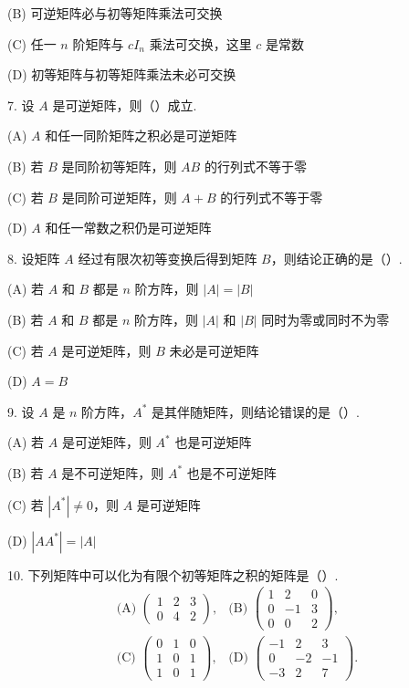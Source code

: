 \documentclass[UTF8, 12pt, fontset=fandol, oneside]{ctexart}
\begin{document}
(B) 可逆矩阵必与初等矩阵乘法可交换

(C) 任一 $n$ 阶矩阵与 $cI_n$ 乘法可交换，这里 $c$ 是常数

(D) 初等矩阵与初等矩阵乘法未必可交换

7. 设 $A$ 是可逆矩阵，则（\quad ）成立.

(A) $A$ 和任一同阶矩阵之积必是可逆矩阵

(B) 若 $B$ 是同阶初等矩阵，则 $AB$ 的行列式不等于零

(C) 若 $B$ 是同阶可逆矩阵，则 $A+B$ 的行列式不等于零

(D) $A$ 和任一常数之积仍是可逆矩阵

8. 设矩阵 $A$ 经过有限次初等变换后得到矩阵 $B$，则结论正确的是（\quad ）.

(A) 若 $A$ 和 $B$ 都是 $n$ 阶方阵，则 $|A|=|B|$

(B) 若 $A$ 和 $B$ 都是 $n$ 阶方阵，则 $|A|$ 和 $|B|$ 同时为零或同时不为零

(C) 若 $A$ 是可逆矩阵，则 $B$ 未必是可逆矩阵

(D) $A=B$

9. 设 $A$ 是 $n$ 阶方阵，$A^*$ 是其伴随矩阵，则结论错误的是（\quad ）.

(A) 若 $A$ 是可逆矩阵，则 $A^*$ 也是可逆矩阵

(B) 若 $A$ 是不可逆矩阵，则 $A^*$ 也是不可逆矩阵

(C) 若 $|A^*|\ne0$，则 $A$ 是可逆矩阵

(D) $|AA^*|=|A|$

10. 下列矩阵中可以化为有限个初等矩阵之积的矩阵是（\quad ）.
\[
\begin{array}{ll}
\text{(A) }\left(\begin{array}{ccc}1&2&3\\0&4&2\end{array}\right),&
\text{(B) }\left(\begin{array}{ccc}1&2&0\\0&-1&3\\0&0&2\end{array}\right),\\[1em]
\text{(C) }\left(\begin{array}{ccc}0&1&0\\1&0&1\\1&0&1\end{array}\right),&
\text{(D) }\left(\begin{array}{rrr}-1&2&3\\0&-2&-1\\-3&2&7\end{array}\right).
\end{array}
\]
\end{document}

